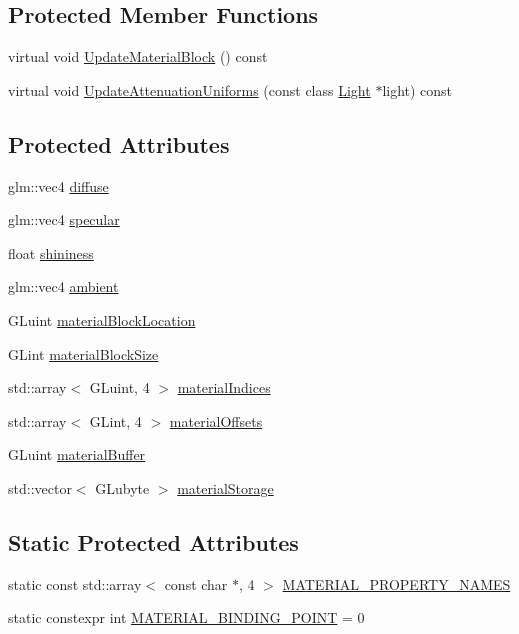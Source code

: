 \subsection*{Protected Member Functions}
\begin{DoxyCompactItemize}
\item 
virtual void \hyperlink{class_blinn_phong_shader_ab620e8e40408c63f465af866e5ca9ef7}{Update\+Material\+Block} () const 
\item 
virtual void \hyperlink{class_blinn_phong_shader_aca3ae20f36d92b4e9b64ca4ae51a49f2}{Update\+Attenuation\+Uniforms} (const class \hyperlink{class_light}{Light} $\ast$light) const 
\end{DoxyCompactItemize}
\subsection*{Protected Attributes}
\begin{DoxyCompactItemize}
\item 
glm\+::vec4 \hyperlink{class_blinn_phong_shader_ae74d0446ec1a871ca57caf002f52e20c}{diffuse}
\item 
glm\+::vec4 \hyperlink{class_blinn_phong_shader_a7adce7364e850b9f232e058956f809b8}{specular}
\item 
float \hyperlink{class_blinn_phong_shader_ad499c2389d7007ecb4c03d5270314933}{shininess}
\item 
glm\+::vec4 \hyperlink{class_blinn_phong_shader_af612b03df22b2bc9e37dcd85124ee9d2}{ambient}
\item 
G\+Luint \hyperlink{class_blinn_phong_shader_a4dcd123c2284945734df697501dca5ea}{material\+Block\+Location}
\item 
G\+Lint \hyperlink{class_blinn_phong_shader_af38b3d042773f6568f0f6c227de85990}{material\+Block\+Size}
\item 
std\+::array$<$ G\+Luint, 4 $>$ \hyperlink{class_blinn_phong_shader_a2b14622a5d0f8ca32c05cc387700692a}{material\+Indices}
\item 
std\+::array$<$ G\+Lint, 4 $>$ \hyperlink{class_blinn_phong_shader_a145f22608d6e32a4ec5df39388ad0530}{material\+Offsets}
\item 
G\+Luint \hyperlink{class_blinn_phong_shader_a85dbf4a8376a98570a06d9df17938cf4}{material\+Buffer}
\item 
std\+::vector$<$ G\+Lubyte $>$ \hyperlink{class_blinn_phong_shader_a7c9644732d35c788d1c94f44b7783d83}{material\+Storage}
\end{DoxyCompactItemize}
\subsection*{Static Protected Attributes}
\begin{DoxyCompactItemize}
\item 
static const std\+::array$<$ const char $\ast$, 4 $>$ \hyperlink{class_blinn_phong_shader_a3c74161a2680b16786f2c97f04e4ee20}{M\+A\+T\+E\+R\+I\+A\+L\+\_\+\+P\+R\+O\+P\+E\+R\+T\+Y\+\_\+\+N\+A\+M\+E\+S}
\item 
static constexpr int \hyperlink{class_blinn_phong_shader_a8c2a0ab9a26c0369ae3b45d5c9bd8f6b}{M\+A\+T\+E\+R\+I\+A\+L\+\_\+\+B\+I\+N\+D\+I\+N\+G\+\_\+\+P\+O\+I\+N\+T} = 0
\end{DoxyCompactItemize}
